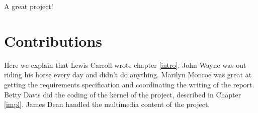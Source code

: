 \documentclass{l3proj}
\begin{document}
A great project!

\section{Contributions}

Here we explain that Lewis Carroll wrote chapter \ref{intro}. John Wayne
was out riding his horse every day and didn't do anything. Marilyn Monroe
was great at getting the requirements specification and coordinating the
writing of the report. Betty Davis did the coding of the kernel of the
project, described in Chapter \ref{impl}.  James Dean handled the
multimedia content of the project.



\end{document}
